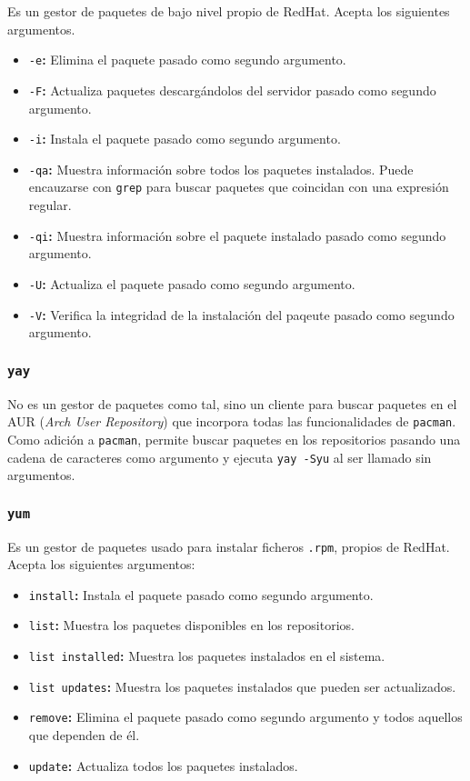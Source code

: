 Es un gestor de paquetes de bajo nivel propio de RedHat.
Acepta los siguientes argumentos.

\begin{itemize}
	\item\texttt{-e}\textbf{:} Elimina el paquete pasado como segundo argumento.
	\item\texttt{-F}\textbf{:} Actualiza paquetes descargándolos del servidor pasado como segundo argumento.
	\item\texttt{-i}\textbf{:} Instala el paquete pasado como segundo argumento.
	\item\texttt{-qa}\textbf{:} Muestra información sobre todos los paquetes instalados. Puede encauzarse con \texttt{grep} para buscar paquetes que coincidan con una expresión regular.
	\item\texttt{-qi}\textbf{:} Muestra información sobre el paquete instalado pasado como segundo argumento.
	\item\texttt{-U}\textbf{:} Actualiza el paquete pasado como segundo argumento.
	\item\texttt{-V}\textbf{:} Verifica la integridad de la instalación del paqeute pasado como segundo argumento.
\end{itemize}

\subsubsection{\texttt{yay}}

No es un gestor de paquetes como tal, sino un cliente para buscar paquetes en el AUR (\emph{Arch User Repository}) que incorpora todas las funcionalidades de \texttt{pacman}.
Como adición a \texttt{pacman}, permite buscar paquetes en los repositorios pasando una cadena de caracteres como argumento y ejecuta \texttt{yay -Syu} al ser llamado sin argumentos.

\subsubsection{\texttt{yum}}

Es un gestor de paquetes usado para instalar ficheros \texttt{.rpm}, propios de RedHat.
Acepta los siguientes argumentos:

\begin{itemize}
	\item\texttt{install}\textbf{:} Instala el paquete pasado como segundo argumento.
	\item\texttt{list}\textbf{:} Muestra los paquetes disponibles en los repositorios.
	\item\texttt{list installed}\textbf{:} Muestra los paquetes instalados en el sistema.
	\item\texttt{list updates}\textbf{:} Muestra los paquetes instalados que pueden ser actualizados.
	\item\texttt{remove}\textbf{:} Elimina el paquete pasado como segundo argumento y todos aquellos que dependen de él.
	\item\texttt{update}\textbf{:} Actualiza todos los paquetes instalados.
\end{itemize}

